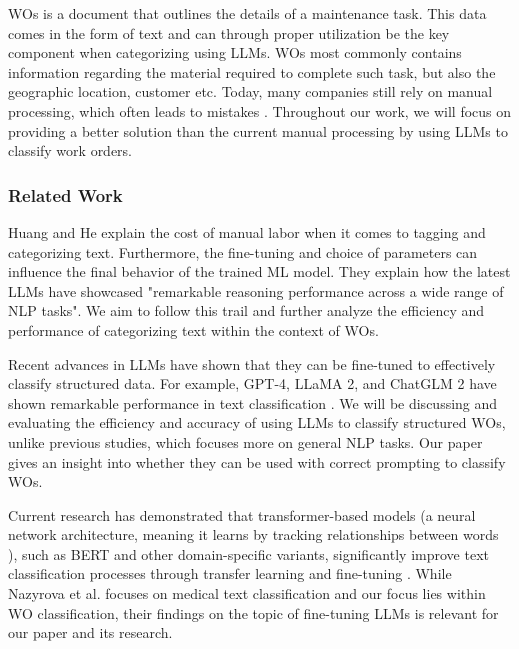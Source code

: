 WOs is a document that outlines the details of a maintenance task.
This data comes in the form of text and can through proper utilization be the
key component when categorizing using LLMs.
WOs most commonly contains information regarding the material required to
complete such task, but also the geographic location, customer etc.
Today, many companies still rely on manual processing, which often leads to
mistakes \cite{ibm2023} \cite{li2024}.
Throughout our work, we will focus on providing a better solution than the
current manual processing by using LLMs to classify work orders.

\subsubsection{Related Work}

Huang and He \cite{huang2024} explain the cost of manual labor when it comes to
tagging and categorizing text.
Furthermore, the fine-tuning and choice of parameters can influence the final
behavior of the trained ML model.
They explain how the latest LLMs have showcased "remarkable reasoning
performance across a wide range of NLP tasks".
We aim to follow this trail and further analyze the efficiency and performance
of categorizing text within the context of WOs.

\bigskip
Recent advances in LLMs have shown that they can be fine-tuned to effectively
classify structured data.
For example, GPT-4, LLaMA 2, and ChatGLM 2 have shown remarkable performance in
text classification \cite{zhang2024}.
We will be discussing and evaluating the efficiency and accuracy of using LLMs
to classify structured WOs, unlike previous studies, which focuses more on
general NLP tasks.
Our paper gives an insight into whether they can be used with correct prompting
to classify WOs.

\bigskip
Current research has demonstrated that transformer-based models
(a neural network architecture, meaning it learns by tracking relationships
between words \cite{merritt2022}),
such as BERT and other domain-specific variants, significantly improve text
classification processes through transfer learning and fine-tuning
\cite{nazyrova2024}.
While Nazyrova et al. focuses on medical text classification and our focus lies
within WO classification, their findings on the topic of fine-tuning LLMs is
relevant for our paper and its research.
